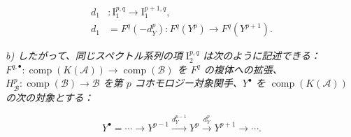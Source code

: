 \[
\begin{aligned}
d_1&\colon\mathrm I_1^{p,q}\longrightarrow\mathrm I_1^{p+1,q},\\
d_1&=F^q(-d_Y^p)\colon F^q(Y^p)\longrightarrow F^q(Y^{p+1}).
\end{aligned}
\]

\noindent\textit{b) したがって、同じスペクトル系列の項
$\mathrm I_2^{p,q}$ は次のように記述できる：
$F^{q,\bullet}\colon\operatorname{comp}(K(\mathcal A))
\longrightarrow\operatorname{comp}(\mathcal B)$ を $F^q$ の複体への拡張、
$H_{\mathcal B}^p\colon\operatorname{comp}(\mathcal B)
\longrightarrow\mathcal B$ を第 $p$ コホモロジー対象関手、$Y^\bullet$ を
$\operatorname{comp}(K(\mathcal A))$ の次の対象とする：}

\[
Y^\bullet=\cdots\longrightarrow Y^{p-1}
\xrightarrow{d_Y^{p-1}}Y^p\xrightarrow{d_Y^p}Y^{p+1}
\longrightarrow\cdots.
\]
\endgroup
